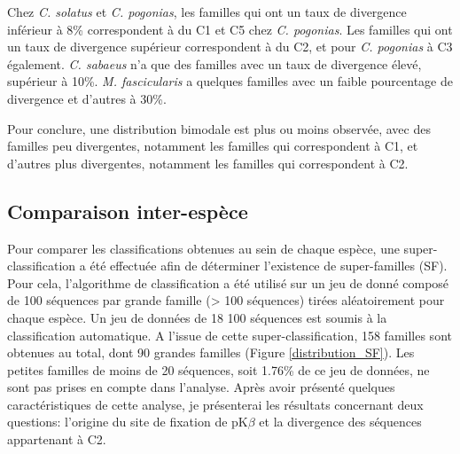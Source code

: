 \documentclass[12pt,a4paper]{article}
\begin{document}
	Chez \textit{C. solatus} et \textit{C. pogonias}, les familles qui ont un taux de divergence inférieur à 8\% correspondent à du C1 et C5 chez \textit{C. pogonias}. Les familles qui ont un taux de divergence supérieur correspondent à du C2, et pour \textit{C. pogonias} à C3 également. \textit{C. sabaeus} n'a que des familles avec un taux de divergence élevé, supérieur à 10\%. \textit{M. fascicularis} a quelques familles avec un faible pourcentage de divergence et d'autres à 30\%. 
	
	Pour conclure, une distribution bimodale est plus ou moins observée, avec des familles peu divergentes, notamment les familles qui correspondent à C1, et d'autres plus divergentes, notamment les familles qui correspondent à C2.
	
	\subsection{Comparaison inter-espèce}
	Pour comparer les classifications obtenues au sein de chaque espèce, une super-classification a été effectuée afin de déterminer l'existence de super-familles (SF). Pour cela, l'algorithme de classification a été utilisé sur un jeu de donné composé de 100 séquences par grande famille (> 100 séquences) tirées aléatoirement pour chaque espèce. Un jeu de données de 18 100 séquences est soumis à la classification automatique. A l'issue de cette super-classification, 158 familles sont obtenues au total, dont 90 grandes familles (Figure \ref{distribution_SF}). Les petites familles de moins de 20 séquences, soit 1.76\% de ce jeu de données, ne sont pas prises en compte dans l'analyse. Après avoir présenté quelques caractéristiques de cette analyse, je présenterai les résultats concernant deux questions: l'origine du site de fixation de pK$\beta$ et la divergence des séquences appartenant à C2.
	
\end{document}
